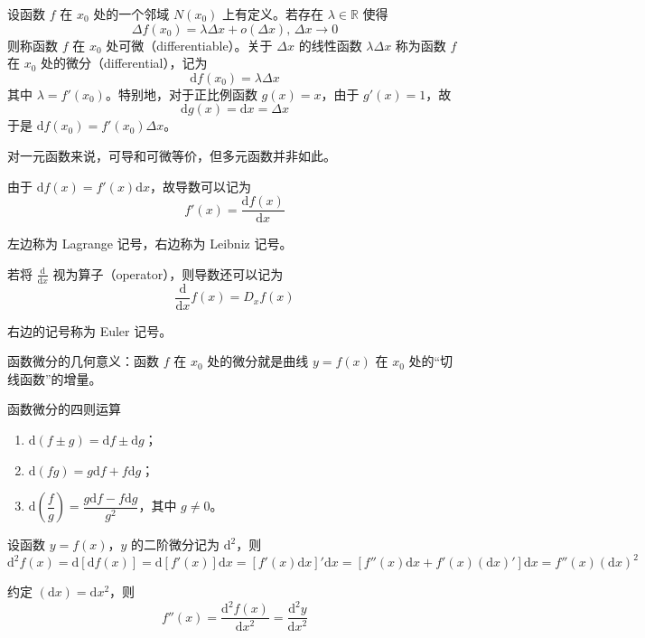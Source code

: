\begin{definition}
  设函数 $f$ 在 $x_0$ 处的一个邻域 $N(x_0)$ 上有定义。若存在 $\lambda\in \mathbb{R}$ 使得
  \[\Delta f(x_0) = \lambda\Delta x + o(\Delta x),\, \Delta x\to 0\]
  则称函数 $f$ 在 $x_0$ 处可微（differentiable）。关于 $\Delta x$ 的线性函数 $\lambda\Delta x$ 称为函数 $f$ 在 $x_0$ 处的微分（differential），记为
  \[\mathrm{d}f(x_0) = \lambda\Delta x\]
  其中 $\lambda = f'(x_0)$。特别地，对于正比例函数 $g(x) = x$，由于 $g'(x) = 1$，故
  \[\mathrm{d}g(x) = \mathrm{d}x = \Delta x\]
  于是 $\mathrm{d}f(x_0) = f'(x_0)\Delta x$。
\end{definition}

对一元函数来说，可导和可微等价，但多元函数并非如此。

由于 $\mathrm{d}f(x) = f'(x)\mathrm{d}x$，故导数可以记为
\begin{equation}
  f'(x) = \frac{\mathrm{d}f(x)}{\mathrm{d}x}
\end{equation}

左边称为 Lagrange 记号，右边称为 Leibniz 记号。

若将 $\displaystyle \frac{\mathrm{d}}{\mathrm{d}x}$ 视为算子（operator），则导数还可以记为
\[\frac{\mathrm{d}}{\mathrm{d}x}f(x) = D_{x}f(x)\]

右边的记号称为 Euler 记号。

函数微分的几何意义：函数 $f$ 在 $x_0$ 处的微分就是曲线 $y = f(x)$ 在 $x_0$ 处的“切线函数”的增量。

\begin{theorem}
  函数微分的四则运算
  \begin{enumerate}
    \item $\mathrm{d}(f \pm g) = \mathrm{d}f \pm \mathrm{d}g$；
    \item $\mathrm{d}(fg) = g\mathrm{d}f + f\mathrm{d}g$；
    \item $\mathrm{d}\left(\dfrac{f}{g}\right) = \dfrac{g\mathrm{d}f - f\mathrm{d}g}{g^2}$，其中 $g \ne 0$。
  \end{enumerate}
\end{theorem}

设函数 $y = f(x)$，$y$ 的二阶微分记为 $\mathrm{d}^2$，则
\[\mathrm{d}^2f(x) = \mathrm{d}[\mathrm{d}f(x)] = \mathrm{d}[f'(x)]\mathrm{d}x = [f'(x)\mathrm{d}x]'\mathrm{d}x = [f''(x)\mathrm{d}x + f'(x)(\mathrm{d}x)']\mathrm{d}x = f''(x)(\mathrm{d}x)^2\]

约定 $(\mathrm{d}x) = \mathrm{d}x^2$，则
\[f''(x) = \frac{\mathrm{d}^{2}f(x)}{\mathrm{d}x^2} = \frac{\mathrm{d}^{2}y}{\mathrm{d}x^2}\]


